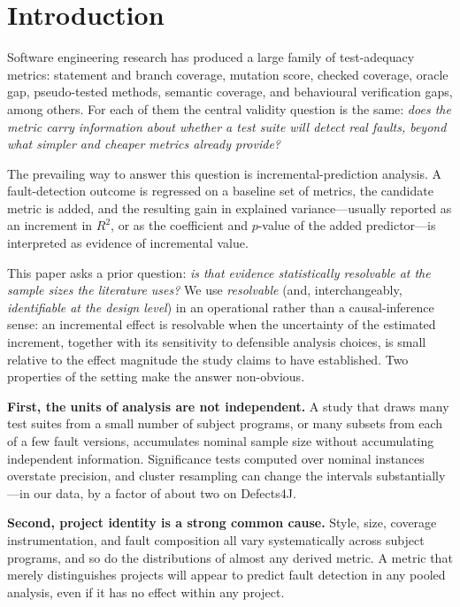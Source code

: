 \documentclass[preprint,12pt]{elsarticle}
\begin{document}
\section{Introduction}
\label{sec:intro}

Software engineering research has produced a large family of test-adequacy
metrics: statement and branch coverage, mutation score, checked coverage,
oracle gap, pseudo-tested methods, semantic coverage, and behavioural
verification gaps, among others. For each of them the central validity
question is the same: \emph{does the metric carry information about whether a
test suite will detect real faults, beyond what simpler and cheaper metrics
already provide?}

The prevailing way to answer this question is incremental-prediction
analysis. A fault-detection outcome is regressed on a baseline set of
metrics, the candidate metric is added, and the resulting gain in explained
variance---usually reported as an increment in $R^2$, or as the coefficient
and $p$-value of the added predictor---is interpreted as evidence of
incremental value.

This paper asks a prior question: \emph{is that evidence statistically
resolvable at the sample sizes the literature uses?} We use
\emph{resolvable} (and, interchangeably, \emph{identifiable at the design
level}) in an operational rather than a causal-inference sense: an
incremental effect is resolvable when the uncertainty of the estimated
increment, together with its sensitivity to defensible analysis choices, is
small relative to the effect magnitude the study claims to have
established. Two properties of the setting make the answer non-obvious.

\textbf{First, the units of analysis are not independent.} A study that
draws many test suites from a small number of subject programs, or many
subsets from each of a few fault versions, accumulates nominal sample size
without accumulating independent information. Significance tests computed
over nominal instances overstate precision, and cluster resampling can change the intervals
substantially---in our data, by a factor of about two on Defects4J.

\textbf{Second, project identity is a strong common cause.} Style, size,
coverage instrumentation, and fault composition all vary systematically
across subject programs, and so do the distributions of almost any derived
metric. A metric that merely distinguishes projects will appear to predict
fault detection in any pooled analysis, even if it has no effect within any
project.
\end{document}
